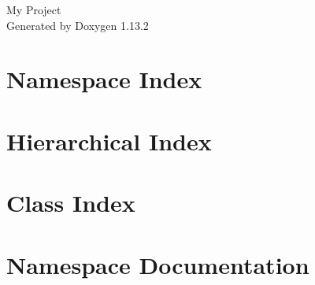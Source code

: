 \documentclass[twoside]{book}
\newcommand{\+}{\discretionary{\mbox{\scriptsize$\hookleftarrow$}}{}{}}
\newcommand{\clearemptydoublepage}{%
    \newpage{\pagestyle{empty}\cleardoublepage}%
  }
\begin{document}
  \raggedbottom
    \hypersetup{pageanchor=false,
                bookmarksnumbered=true,
                pdfencoding=unicode
               }
  \begin{titlepage}
  \vspace*{7cm}
  \begin{center}%
  {\Large My Project}\\
  \vspace*{1cm}
  {\large Generated by Doxygen 1.13.2}\\
  \end{center}
  \end{titlepage}
  \clearemptydoublepage
  \tableofcontents
  \clearemptydoublepage
  \hypersetup{pageanchor=true}

\chapter{Namespace Index}

\chapter{Hierarchical Index}

\chapter{Class Index}

\chapter{Namespace Documentation}














\end{document}
